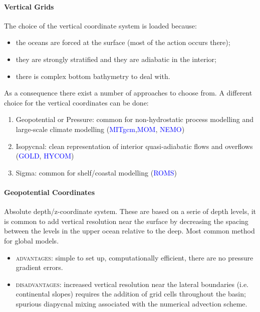 \paragraph{Vertical Grids}
The choice of the vertical coordinate system is loaded because:
\begin{itemize}
	\item the oceans are forced at the surface (most of the action occurs there);
	\item they are strongly stratified and they are adiabatic in the interior;
	\item there is complex bottom bathymetry to deal with.
\end{itemize}
As a consequence there exist a number of approaches to choose from. A different choice for the vertical coordinates can be done:
\begin{enumerate}
	\item Geopotential or Pressure: common for non-hydrostatic process modelling and large-scale climate modelling (\textcolor{Blue}{MITgcm},\textcolor{Blue}{MOM}, \textcolor{Blue}{NEMO})
	\item Isopycnal:  clean representation of interior quasi-adiabatic flows and overflows (\textcolor{Blue}{GOLD}, \textcolor{Blue}{HYCOM})
	\item Sigma: common for shelf/coastal modelling (\textcolor{Blue}{ROMS})
\end{enumerate}

\paragraph{Geopotential Coordinates}
Absolute depth/z-coordinate system. These are based on a serie of depth levels, it is common to add vertical resolution near the surface by decreasing the spacing between the levels in the upper ocean relative to the deep. Most common method for global models.
\begin{itemize}
	\item \textsc{advantages}: simple to set up, computationally efficient, there are no pressure gradient errors.
	\item \textsc{disadvantages}: increased vertical resolution near the lateral boundaries (i.e. continental slopes) requires the addition of grid cells throughout the basin; spurious diapycnal mixing associated with the numerical advection scheme.

\end{itemize}

